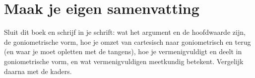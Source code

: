 
\begin{oefeningen}






\end{oefeningen}


\ifzelfstudie
\section*{Maak je eigen samenvatting}
Sluit dit boek en schrijf in je schrift: wat het argument en de hoofdwaarde zijn, de goniometrische vorm, hoe je omzet van cartesisch naar goniometrisch en terug (en waar je moet opletten met de tangens), hoe je vermenigvuldigt en deelt in goniometrische vorm, en wat vermenigvuldigen meetkundig betekent. Vergelijk daarna met de kaders.
\fi
